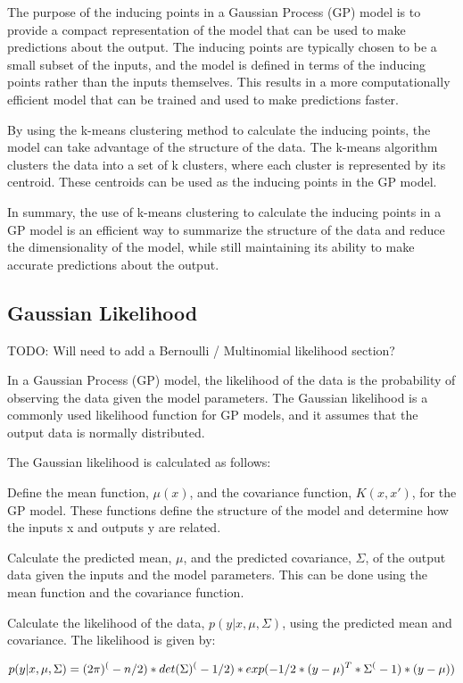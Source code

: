 \documentclass[12pt,a4paper]{report}
\begin{document}
The purpose of the inducing points in a Gaussian Process (GP) model is to provide a compact representation of the model that can be used to make predictions about the output. The inducing points are typically chosen to be a small subset of the inputs, and the model is defined in terms of the inducing points rather than the inputs themselves. This results in a more computationally efficient model that can be trained and used to make predictions faster.

By using the k-means clustering method to calculate the inducing points, the model can take advantage of the structure of the data. The k-means algorithm clusters the data into a set of k clusters, where each cluster is represented by its centroid. These centroids can be used as the inducing points in the GP model.

In summary, the use of k-means clustering to calculate the inducing points in a GP model is an efficient way to summarize the structure of the data and reduce the dimensionality of the model, while still maintaining its ability to make accurate predictions about the output.

\subsection{Gaussian Likelihood}

TODO: Will need to add a Bernoulli / Multinomial likelihood section?

In a Gaussian Process (GP) model, the likelihood of the data is the probability of observing the data given the model parameters. The Gaussian likelihood is a commonly used likelihood function for GP models, and it assumes that the output data is normally distributed.

The Gaussian likelihood is calculated as follows:

Define the mean function, $\mu(x)$, and the covariance function, $K(x, x')$, for the GP model. These functions define the structure of the model and determine how the inputs x and outputs y are related.

Calculate the predicted mean, $\mu$, and the predicted covariance, $\Sigma$, of the output data given the inputs and the model parameters. This can be done using the mean function and the covariance function.

Calculate the likelihood of the data, $p(y|x, \mu, \Sigma)$, using the predicted mean and covariance. The likelihood is given by:

\begin{equation}
    \centering
    p(y|x, \mu, \Sigma) = (2\pi)^(-n/2) * det(\Sigma)^(-1/2) * exp(-1/2 * (y - \mu)^T * \Sigma^(-1) * (y - \mu))
\end{equation}
\end{document}
